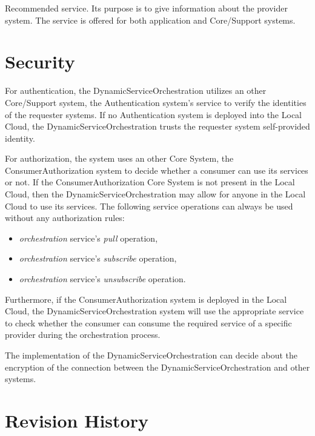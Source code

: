 \documentclass[a4paper]{arrowhead}
\begin{document}
Recommended service. Its purpose is to give information about the provider system. The service is offered for both application and Core/Support systems. 

\newpage

\section{Security}
\label{sec:security}

For authentication, the DynamicServiceOrchestration utilizes an other Core/Support system, the Authentication system's service to verify the identities of the requester systems. If no Authentication system is deployed into the Local Cloud, the DynamicServiceOrchestration trusts the requester system self-provided identity.

For authorization, the system uses an other Core System, the ConsumerAuthorization system to decide whether a consumer can use its services or not. If the ConsumerAuthorization Core System is not present in the Local Cloud, then the DynamicServiceOrchestration may allow for anyone in the Local Cloud to use its services. The following service operations can always be used without any authorization rules:

\begin{itemize}
    \item \textit{orchestration} service's \textit{pull} operation,
    \item \textit{orchestration} service's \textit{subscribe} operation,
    \item \textit{orchestration} service's \textit{unsubscribe} operation.
\end{itemize}

Furthermore, if the ConsumerAuthorization system is deployed in the Local Cloud, the DynamicServiceOrchestration system will use the appropriate service to check whether the consumer can consume the required service of a specific provider during the orchestration process.

The implementation of the DynamicServiceOrchestration can decide about the encryption of the connection between the DynamicServiceOrchestration and other systems. 

\newpage




\newpage

\section{Revision History}
\end{document}
